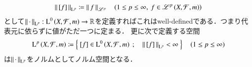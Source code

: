 \begin{itembox}[l]{}
	\begin{lem}[商空間におけるノルムの定義]
		\begin{align}
			\left\|\, [f]\, \right\|_{\mathrm{L}^p} \coloneqq \left\|\, f\, \right\|_{\mathscr{L}^p} \quad (1 \leq p \leq \infty,\ f \in \mathscr{L}^{p} \left(X,\mathcal{F},m\right))
		\end{align}
		として$\left\|\, \cdot\, \right\|_{\mathrm{L}^p}:\operatorname{L}^{0} \left(X,\mathcal{F},m\right) \rightarrow \mathbb{R}$を定義すればこれはwell-definedである．つまり代表元に依らずに値がただ一つに定まる．
		更に次で定義する空間
		\begin{align}
			\operatorname{L}^{p} \left(X,\mathcal{F},m\right) \coloneqq \left\{\ [f] \in \operatorname{L}^{0} \left(X,\mathcal{F},m\right)\ ;\quad \left\|\, [f]\, \right\|_{\mathrm{L}^p} < \infty\ \right\} \quad (1 \leq p \leq \infty)
		\end{align}
		は$\left\|\, \cdot\, \right\|_{\mathrm{L}^p}$をノルムとしてノルム空間となる．
	\end{lem}
\end{itembox}
